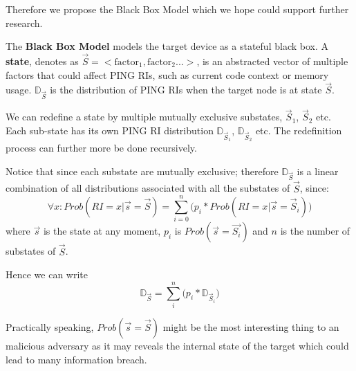 Therefore we propose the Black Box Model which we hope could support further research.

\begin{definition}
The \textbf{Black Box Model} models the target device as a stateful black box. A \textbf{state}, denotes as $\vec{S}=<\text{factor}_1, \text{factor}_2...>$, is an abstracted vector of multiple factors that could affect PING RIs, such as current code context or memory usage. $\mathbb{D}_\vec{S}$ is the distribution of PING RIs when the target node is at state $\vec{S}$.
\end{definition}

We can redefine a state by multiple mutually exclusive substates, $\vec{S}_1$, $\vec{S}_2$ etc. Each sub-state has its own PING RI distribution $\mathbb{D}_{\vec{S}_1}$, $\mathbb{D}_{\vec{S}_2}$ etc. The redefinition process can further more be done recursively.

Notice that since each substate are mutually exclusive; therefore $\mathbb{D}_{\vec{S}}$ is a linear combination of all distributions associated with all the substates of $\vec{S}$, since:
\begin{equation*}
\forall x: Prob(RI = x | \vec{s}=\vec{S}) = \sum_{i=0}^{n}{\big( p_i*Prob(RI = x | \vec{s} = \vec{S}_i)\big)}
\end{equation*}
where $\vec{s}$ is the state at any moment, $p_i$ is $Prob(\vec{s} = \vec{S_i})$ and $n$ is the number of substates of $\vec{S}$.

Hence we can write
\begin{equation}
\mathbb{D}_{\vec{S}} = \sum_{i}^{n}{\big(p_i * \mathbb{D}_{\vec{S}_i} \big)}
\end{equation}

Practically speaking, $Prob(\vec{s} = \vec{S})$ might be the most interesting thing to an malicious adversary as it may reveals the internal state of the target which could lead to many information breach.

